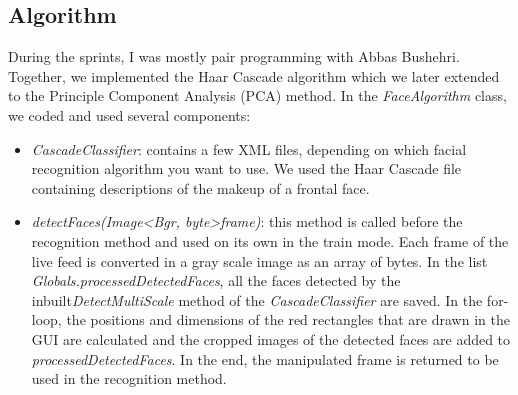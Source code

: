 \documentclass[12pt, a4paper]{article}
\begin{document}
\subsection{Algorithm}
During the sprints, I was mostly pair programming with Abbas Bushehri. Together, we implemented the Haar Cascade algorithm which we later extended to the Principle Component Analysis (PCA) method. In the \textit{FaceAlgorithm} class, we coded and used several components:
\begin{itemize}
\item\textit{CascadeClassifier}: contains a few XML files, depending on which facial recognition algorithm you want to use. We used the Haar Cascade file containing descriptions of the makeup of a frontal face.
\item \textit{detectFaces(Image\textless Bgr, byte\textgreater  frame)}: this method is called before the recognition method and used on its own in the train mode. Each frame of the live feed is converted in a gray scale image as an array of bytes. In the list \textit{Globals.processedDetectedFaces}, all the faces detected by the inbuilt\textit{DetectMultiScale} method of the \textit{CascadeClassifier} are saved. In the for-loop, the positions and dimensions of the red rectangles that are drawn in the GUI are calculated and the cropped images of the detected faces are added to\textit{ processedDetectedFaces}. In the end, the manipulated frame is returned to be used in the recognition method.

\end{itemize}
\end{document}
